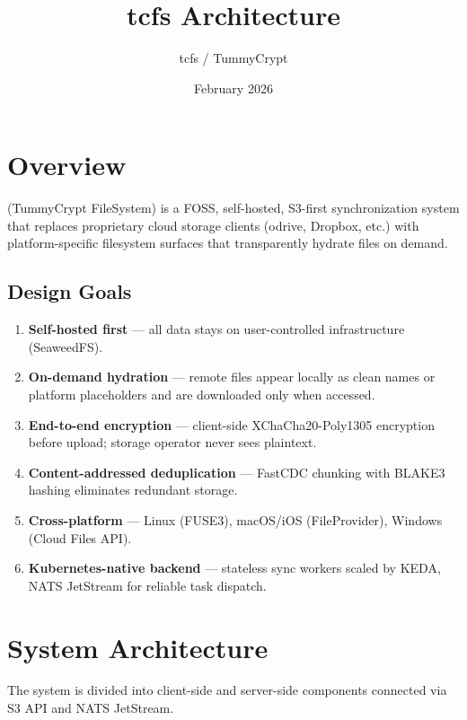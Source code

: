 \documentclass[11pt,a4paper]{article}
\title{tcfs Architecture}
\author{tcfs / TummyCrypt}
\date{February 2026}
\begin{document}
\maketitle
\tableofcontents
\newpage

\section{Overview}

\tcfs{} (TummyCrypt FileSystem) is a FOSS, self-hosted, S3-first synchronization
system that replaces proprietary cloud storage clients (odrive, Dropbox, etc.)
with platform-specific filesystem surfaces that transparently hydrate files on
demand.

\subsection{Design Goals}

\begin{enumerate}
  \item \textbf{Self-hosted first} --- all data stays on user-controlled infrastructure (SeaweedFS).
  \item \textbf{On-demand hydration} --- remote files appear locally as clean
        names or platform placeholders and are downloaded only when accessed.
  \item \textbf{End-to-end encryption} --- client-side XChaCha20-Poly1305 encryption
        before upload; storage operator never sees plaintext.
  \item \textbf{Content-addressed deduplication} --- FastCDC chunking with BLAKE3
        hashing eliminates redundant storage.
  \item \textbf{Cross-platform} --- Linux (FUSE3), macOS/iOS (FileProvider), Windows (Cloud Files API).
  \item \textbf{Kubernetes-native backend} --- stateless sync workers scaled by KEDA,
        NATS JetStream for reliable task dispatch.
\end{enumerate}

\section{System Architecture}

The system is divided into client-side and server-side components connected
via S3 API and NATS JetStream.
\end{document}
